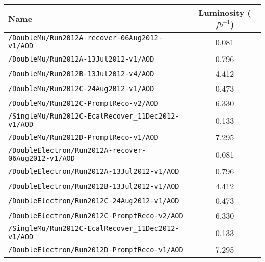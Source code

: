 \begin{table}[hbt]
\begin{center}
\begin{tabular}{lc}\hline\hline
Name		 & Luminosity ($fb^{-1}$) \\ \hline
\verb=/DoubleMu/Run2012A-recover-06Aug2012-v1/AOD=                  &  0.081 \\ 
\verb=/DoubleMu/Run2012A-13Jul2012-v1/AOD=                                         & 0.796               \\ 
\verb=/DoubleMu/Run2012B-13Jul2012-v4/AOD=                                          & 4.412             \\ 
\verb=/DoubleMu/Run2012C-24Aug2012-v1/AOD=                                 & 0.473\\  
\verb=/DoubleMu/Run2012C-PromptReco-v2/AOD=                                    & 6.330                \\ 
\verb=/SingleMu/Run2012C-EcalRecover_11Dec2012-v1/AOD=           & 0.133\\
\verb=/DoubleMu/Run2012D-PromptReco-v1/AOD=                                 &  7.295 \\

\verb=/DoubleElectron/Run2012A-recover-06Aug2012-v1/AOD=              & 0.081              \\ 
\verb=/DoubleElectron/Run2012A-13Jul2012-v1/AOD=                            & 0.796                    \\ 
\verb=/DoubleElectron/Run2012B-13Jul2012-v1/AOD=                           & 4.412\\ 
\verb=/DoubleElectron/Run2012C-24Aug2012-v1/AOD=                           & 0.473                 \\ 
\verb=/DoubleElectron/Run2012C-PromptReco-v2/AOD=                          & 6.330             \\ 
\verb=/SingleMu/Run2012C-EcalRecover_11Dec2012-v1/AOD=           & 0.133\\
\verb=/DoubleElectron/Run2012D-PromptReco-v1/AOD=                        &  7.295 \\


\end{tabular}
\end{center}
\end{table}
